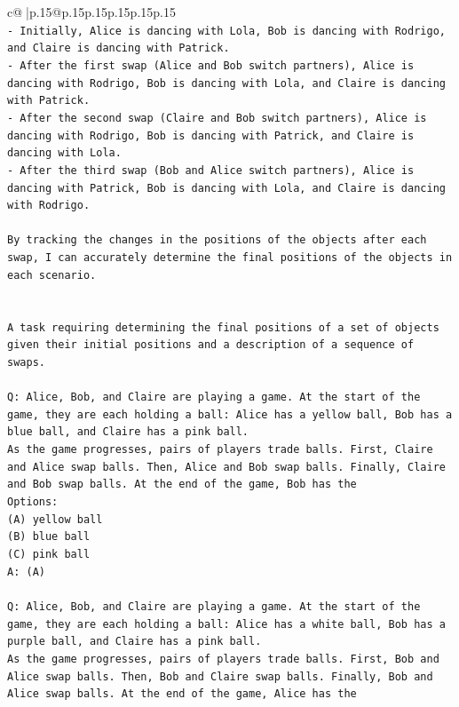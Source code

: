 \documentclass{article}
\begin{document}
{\begin{supertabular}{c@{$\;$}|p{.15\linewidth}@{}p{.15\linewidth}p{.15\linewidth}p{.15\linewidth}p{.15\linewidth}p{.15\linewidth}}
{{{\\ 
\texttt{{-} Initially, Alice is dancing with Lola, Bob is dancing with Rodrigo, and Claire is dancing with Patrick.} \\
\texttt{{-} After the first swap (Alice and Bob switch partners), Alice is dancing with Rodrigo, Bob is dancing with Lola, and Claire is dancing with Patrick.} \\
\texttt{{-} After the second swap (Claire and Bob switch partners), Alice is dancing with Rodrigo, Bob is dancing with Patrick, and Claire is dancing with Lola.} \\
\texttt{{-} After the third swap (Bob and Alice switch partners), Alice is dancing with Patrick, Bob is dancing with Lola, and Claire is dancing with Rodrigo.} \\
\\ 
\texttt{By tracking the changes in the positions of the objects after each swap, I can accurately determine the final positions of the objects in each scenario.} \\
\\ 
\\ 
\texttt{A task requiring determining the final positions of a set of objects given their initial positions and a description of a sequence of swaps.} \\
\\ 
\texttt{Q: Alice, Bob, and Claire are playing a game. At the start of the game, they are each holding a ball: Alice has a yellow ball, Bob has a blue ball, and Claire has a pink ball.} \\
\texttt{As the game progresses, pairs of players trade balls. First, Claire and Alice swap balls. Then, Alice and Bob swap balls. Finally, Claire and Bob swap balls. At the end of the game, Bob has the} \\
\texttt{Options:} \\
\texttt{(A) yellow ball} \\
\texttt{(B) blue ball} \\
\texttt{(C) pink ball} \\
\texttt{A: (A)} \\
\\ 
\texttt{Q: Alice, Bob, and Claire are playing a game. At the start of the game, they are each holding a ball: Alice has a white ball, Bob has a purple ball, and Claire has a pink ball.} \\
\texttt{As the game progresses, pairs of players trade balls. First, Bob and Alice swap balls. Then, Bob and Claire swap balls. Finally, Bob and Alice swap balls. At the end of the game, Alice has the} \\
}}}
\end{supertabular}}
\end{document}
